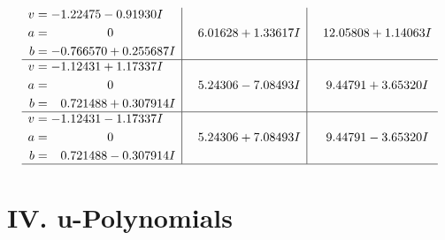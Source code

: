 \documentclass[1p]{elsarticle_modified}
\theoremstyle{definition}
\begin{document}
$$\begin{array}{c|c|c}
\begin{aligned}
v &= -1.22475 - 0.91930 I \\
a &= \phantom{-0.000000 } 0 \\
b &= -0.766570 + 0.255687 I\end{aligned}
 & \phantom{-}6.01628 + 1.33617 I & \phantom{-}12.05808 + 1.14063 I \\ \hline\begin{aligned}
v &= -1.12431 + 1.17337 I \\
a &= \phantom{-0.000000 } 0 \\
b &= \phantom{-}0.721488 + 0.307914 I\end{aligned}
 & \phantom{-}5.24306 - 7.08493 I & \phantom{-}9.44791 + 3.65320 I \\ \hline\begin{aligned}
v &= -1.12431 - 1.17337 I \\
a &= \phantom{-0.000000 } 0 \\
b &= \phantom{-}0.721488 - 0.307914 I\end{aligned}
 & \phantom{-}5.24306 + 7.08493 I & \phantom{-}9.44791 - 3.65320 I\\
 \hline 
 \end{array}$$\newpage
\newpage\renewcommand{\arraystretch}{1}
\centering \section*{ IV. u-Polynomials}
\end{document}
